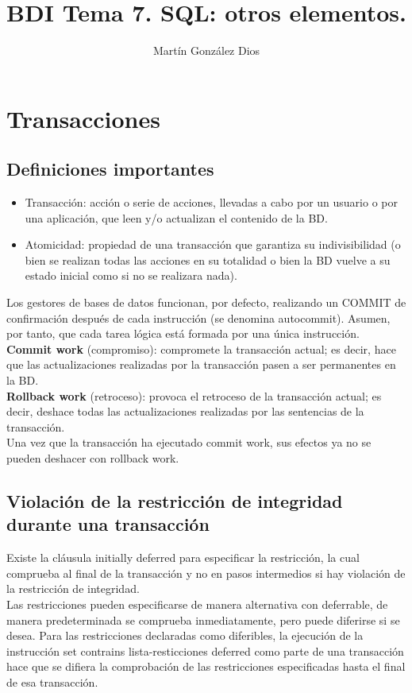 \documentclass{article}
\title{BDI Tema 7. SQL: otros elementos.}
\author{Martín González Dios}
\begin{document}
\maketitle

\section{Transacciones}
\subsection{Definiciones importantes}
\begin{itemize}
\item Transacción: acción o serie de acciones, llevadas a cabo por un usuario o por una aplicación, que leen y/o actualizan el contenido de la BD.
\item Atomicidad: propiedad de una transacción que garantiza su indivisibilidad (o bien se realizan todas las acciones en su totalidad o bien la BD vuelve a su estado inicial como si no se realizara nada).
\end{itemize}
Los gestores de bases de datos funcionan, por defecto, realizando un COMMIT de confirmación después de cada instrucción (se denomina autocommit). Asumen, por tanto, que cada tarea lógica está formada por una única instrucción. \\
\textbf{Commit work} (compromiso): compromete la transacción actual; es decir, hace que las actualizaciones realizadas por la transacción pasen a ser permanentes en la BD. \\
\textbf{Rollback work} (retroceso): provoca el retroceso de la transacción actual; es decir, deshace todas las actualizaciones realizadas por las sentencias de la transacción. \\
Una vez que la transacción ha ejecutado commit work, sus efectos ya no se pueden deshacer con rollback work.
\subsection{Violación de la restricción de integridad durante una transacción}
Existe la cláusula initially deferred para especificar la restricción, la cual comprueba al final de la transacción y no en pasos intermedios si hay violación de la restricción de integridad. \\
Las restricciones pueden especificarse de manera alternativa con deferrable, de manera predeterminada se comprueba inmediatamente, pero puede diferirse si se desea. Para las restricciones declaradas como diferibles, la ejecución de la instrucción set contrains lista-resticciones deferred como parte de una transacción hace que se difiera la comprobación de las restricciones especificadas hasta el final de esa transacción.
\end{document}
